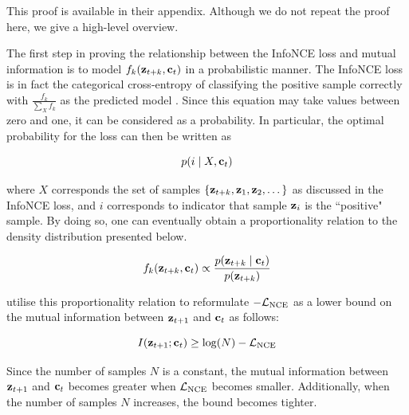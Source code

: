 	This proof is available in their appendix. Although we do not repeat the proof here, we give a high-level overview.
	
	The first step in proving the relationship between the InfoNCE loss and mutual information is to model $f_k(\mathbf{z}_{t+k}, \mathbf{c}_t)$ in a probabilistic manner. The InfoNCE loss is in fact the categorical cross-entropy of classifying the positive sample correctly with $\frac{f_k}{\sum_{X} f_k}$ as the predicted model \citep{oordRepresentationLearningContrastive2019}. Since this equation may take values between zero and one, it can be considered as a probability. In particular, the optimal probability for the loss can then be written as 

	$$p(i \mid X, \mathbf{c}_t)$$
	
	where $X$ corresponds the set of samples  ${ \left\{ \mathbf{z}_{t+k}, \mathbf{z}_1, \mathbf{z}_2, \dots \right\} }$  as discussed in the InfoNCE loss, and $i$ corresponds to indicator that sample $\mathbf{z}_i$ is the ``positive" sample. By doing so, one can eventually obtain a proportionality relation to the density distribution presented below. 
	
	\begin{equation}
		f_k(\mathbf{z}_{t+k}, \mathbf{c}_t) \propto \frac{p(\mathbf{z}_{t+k} \mid \mathbf{c}_t)}{p(\mathbf{z}_{t+k})} \label{eq:fkproporational}
	\end{equation}
	
	\cite{oordRepresentationLearningContrastive2019} utilise this proportionality relation to reformulate $-\mathcal{L}_{\text{NCE}}$ as a lower bound on the mutual information between $\mathbf{z}_{t+1}$ and $\mathbf{c}_t$ as follows:
	
	\begin{equation}
		I(\mathbf{z}_{t+1}; \mathbf{c}_t) \ge \log(N) - \mathcal{L}_{\text{NCE}}
	\end{equation}

	Since the number of samples $N$ is a constant, the mutual information between $\mathbf{z}_{t+1}$ and $\mathbf{c}_t$ becomes greater when $\mathcal{L}_{\text{NCE}}$ becomes smaller. Additionally, when the number of samples $N$ increases, the bound becomes tighter.
	
			
	
	

